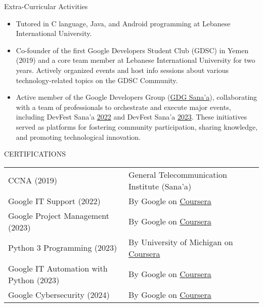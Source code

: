 \documentclass{resume} %
\begin{document}


\begin{rSection}{Extra-Curricular Activities} 
\begin{itemize}
    \item 	Tutored in C language, Java, and Android programming at Lebanese International University.
    \item	Co-founder of the first Google Developers Student Club (GDSC) in Yemen (2019) and a core team member at Lebanese International University for two years. Actively organized events and host info sessions about various technology-related topics on the GDSC Community.
    \item Active member of the Google Developers Group (\href{https://gdgsanaa.com/our-team/}{GDG Sana'a}), collaborating with a team of professionals to orchestrate and execute major events, including DevFest Sana'a \href{https://gdgsanaa.com/event/devfest-sanaa-2022/}{2022} and DevFest Sana'a \href{https://gdgsanaa.com/event/devfest-sanaa-2023/}{2023}. These initiatives served as platforms for fostering community participation, sharing knowledge, and promoting technological innovation.
\end{itemize}


\end{rSection}


\begin{rSection}{CERTIFICATIONS} 

\centering 
\begin{tabular}{@{}>{\raggedright\arraybackslash}p{}>{\raggedright\arraybackslash}p{}@{}} 
    CCNA (2019) & General Telecommunication Institute (Sana'a)\\
    Google IT Support (2022) & By Google on \href{https://www.coursera.org/account/accomplishments/professional-cert/EDS5NDH9KCKP}{Coursera} \\
    Google Project Management (2023) & By Google on \href{https://www.coursera.org/account/accomplishments/professional-cert/LUEGUVMTTNHP}{Coursera} \\ 
    Python 3 Programming (2023) & By University of Michigan on \href{https://www.coursera.org/account/accomplishments/specialization/3RLDPNQXQHW8}{Coursera} \\
    Google IT Automation with Python (2023) & By Google on \href{https://www.coursera.org/account/accomplishments/professional-cert/HPRHTF393HDB}{Coursera} \\
    Google Cybersecurity (2024) & By Google on \href{https://www.coursera.org/account/accomplishments/professional-cert/HD8B8CUD5Y6K}{Coursera} \\
\end{tabular} 

\end{rSection}
\end{document}
